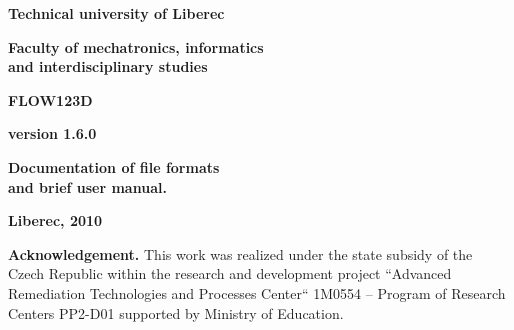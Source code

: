 \documentclass[12pt,a4paper]{report}
\begin{document}
\thispagestyle{empty}
\begin{center}
\noindent 
\textbf{\LARGE{
  Technical university of Liberec
}}

\vspace{2ex}
\textbf{\LARGE{
  Faculty of mechatronics, informatics\\
  and interdisciplinary studies
}}

\vspace{160pt}

\textbf{\Huge{
FLOW123D
}}

\vspace{1cm}
\textbf{\Large{
version 1.6.0
}}

\vspace{1cm}

\textbf{\Large{
Documentation of file formats \\
and brief user manual.
}}


\vspace{10cm}

\noindent \textbf{\Large{Liberec, 2010}}

{\bf Acknowledgement.} This work was realized under the state  subsidy of the Czech Republic within the research and development 
project ``Advanced Remediation Technologies and Processes Center`` 1M0554 
-- Program of Research Centers PP2-D01 supported by Ministry of Education.
\end{center}
\noindent 

\noindent

 

 


 
  
   
\end{document}
